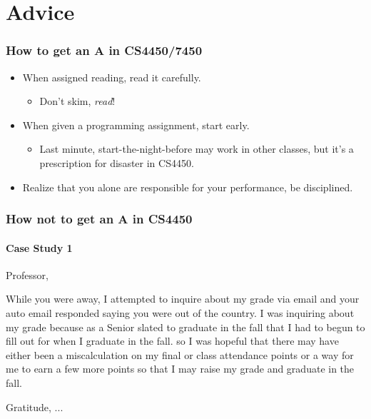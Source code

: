\documentclass{beamer}
\begin{document}
\section{Advice}

\begin{frame}[fragile]
    \frametitle{How to get an A in CS4450/7450}

\begin{itemize}

\item When assigned reading, read it carefully.
\begin{itemize}
\item Don't skim, \emph{read}!
\end{itemize}
\pause

\item When given a programming assignment, start early.
\begin{itemize}
\item Last minute, start-the-night-before may work in other classes, but it's a prescription for disaster in CS4450.
\end{itemize}
\pause 

\item Realize that you alone are responsible for your performance, be disciplined.

\end{itemize}
    
\end{frame}


\begin{frame}[fragile]
\frametitle{How not to get an A in CS4450}
\framesubtitle{Case Study 1}

Professor,

While you were away, I attempted to inquire about my grade via email and your auto email responded saying you were out of the country. I was inquiring about my grade because as a Senior slated to graduate in the fall {\color{blue}{I was hoping to earn an A- in your class after we had taken the final. I needed the A- for gpa purposes for job applications}} that I had to begun to fill out for when I graduate in the fall. {\color{brown}{I work in Dr. Kazic's Lab and she always speaks highly of you}} so I was hopeful that there may have either been a miscalculation on my final or class attendance points or a way for me to earn a few more points so that I may raise my grade and graduate in the fall.

{\color{red}{Is there any way for me to raise my grade a degree?}}

Gratitude,
    ...
\end{frame}
\end{document}
